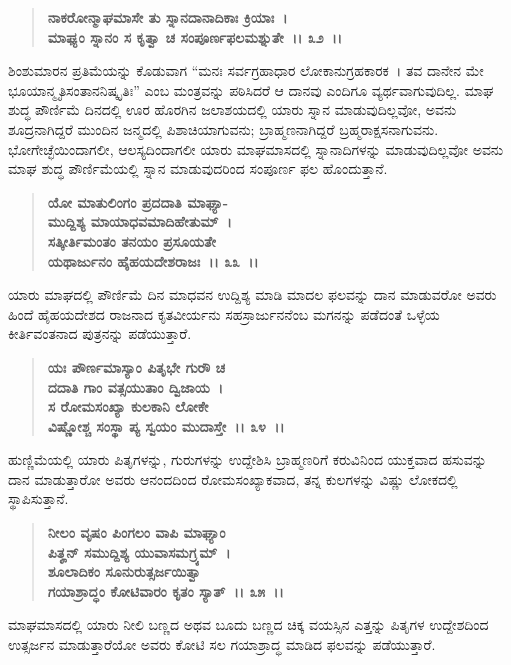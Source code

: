 \begin{verse}
\textbf{ನಾಕರೋನ್ಮಾಘಮಾಸೇ ತು ಸ್ನಾನದಾನಾದಿಕಾಃ ಕ್ರಿಯಾಃ~।}\\\textbf{ಮಾಘ್ಯಂ ಸ್ನಾನಂ ಸ ಕೃತ್ವಾ ಚ ಸಂಪೂರ್ಣಫಲಮಶ್ನುತೇ~।। ೩೨~।।}
\end{verse}

ಶಿಂಶುಮಾರನ ಪ್ರತಿಮೆಯನ್ನು ಕೊಡುವಾಗ “ಮನಃ ಸರ್ವಗ್ರಹಾಧಾರ ಲೋಕಾನುಗ್ರಹಕಾರಕ~। ತವ ದಾನೇನ ಮೇ ಭೂಯಾನ್ಮೃತಿಸಂತಾನನಿಷ್ಕೃತಿಃ” ಎಂಬ ಮಂತ್ರವನ್ನು ಪಠಿಸಿದರೆ ಆ ದಾನವು ಎಂದಿಗೂ ವ್ಯರ್ಥವಾಗುವುದಿಲ್ಲ. ಮಾಘ ಶುದ್ಧ ಪೌರ್ಣಿಮೆ ದಿನದಲ್ಲಿ ಊರ ಹೊರಗಿನ ಜಲಾಶಯದಲ್ಲಿ ಯಾರು ಸ್ನಾನ ಮಾಡುವುದಿಲ್ಲವೋ, ಅವನು ಶೂದ್ರನಾಗಿದ್ದರೆ ಮುಂದಿನ ಜನ್ಮದಲ್ಲಿ ಪಿಶಾಚಿಯಾಗುವನು; ಬ್ರಾಹ್ಮಣನಾಗಿದ್ದರೆ ಬ್ರಹ್ಮರಾಕ್ಷಸನಾಗುವನು. ಭೋಗೇಚ್ಛೆಯಿಂದಾಗಲೀ, ಆಲಸ್ಯದಿಂದಾಗಲೀ ಯಾರು ಮಾಘಮಾಸದಲ್ಲಿ ಸ್ನಾನಾದಿಗಳನ್ನು ಮಾಡುವುದಿಲ್ಲವೋ ಅವನು ಮಾಘ ಶುದ್ಧ ಪೌರ್ಣಿಮೆಯಲ್ಲಿ ಸ್ನಾನ ಮಾಡುವುದರಿಂದ ಸಂಪೂರ್ಣ ಫಲ ಹೊಂದುತ್ತಾನೆ.

\begin{verse}
\textbf{ಯೋ ಮಾತುಲಿಂಗಂ ಪ್ರದದಾತಿ ಮಾಘ್ಯಾ-}\\\textbf{ಮುದ್ದಿಶ್ಯ ಮಾಯಾಧವಮಾದಿಹೇತುಮ್~।}\\\textbf{ಸತ್ಕೀರ್ತಿಮಂತಂ ತನಯಂ ಪ್ರಸೂಯತೇ} \\\textbf{ಯಥಾರ್ಜುನಂ ಹೈಹಯದೇಶರಾಜಃ~।। ೩೩~।।}
\end{verse}

ಯಾರು ಮಾಘದಲ್ಲಿ ಪೌರ್ಣಿಮೆ ದಿನ ಮಾಧವನ ಉದ್ದಿಶ್ಯ ಮಾಡಿ ಮಾದಲ ಫಲವನ್ನು ದಾನ ಮಾಡುವರೋ ಅವರು ಹಿಂದೆ ಹೈಹಯದೇಶದ ರಾಜನಾದ ಕೃತವೀರ್ಯನು ಸಹಸ್ರಾರ್ಜುನನೆಂಬ ಮಗನನ್ನು ಪಡೆದಂತೆ ಒಳ್ಳೆಯ ಕೀರ್ತಿವಂತನಾದ ಪುತ್ರನನ್ನು ಪಡೆಯುತ್ತಾರೆ.

\begin{verse}
\textbf{ಯಃ ಪೌರ್ಣಮಾಸ್ಯಾಂ ಪಿತೃಭೇ ಗುರೌ‌ ಚ} \\\textbf{ದದಾತಿ ಗಾಂ ವತ್ಸಯುತಾಂ ದ್ವಿಜಾಯ~।}\\\textbf{ಸ ರೋಮಸಂಖ್ಯಾ ಕುಲಕಾನಿ ಲೋಕೇ} \\\textbf{ವಿಷ್ಣೋಶ್ಚ ಸಂಸ್ಥಾ ಪ್ಯ ಸ್ವಯಂ ಮುದಾಸ್ತೇ~।। ೩೪~।।}
\end{verse}

ಹುಣ್ಣಿಮೆಯಲ್ಲಿ ಯಾರು ಪಿತೃಗಳನ್ನು, ಗುರುಗಳನ್ನು ಉದ್ದೇಶಿಸಿ ಬ್ರಾಹ್ಮಣರಿಗೆ ಕರುವಿ\-ನಿಂದ ಯುಕ್ತವಾದ ಹಸುವನ್ನು ದಾನ ಮಾಡುತ್ತಾರೋ ಅವರು ಆನಂದದಿಂದ ರೋಮ\-ಸಂಖ್ಯಾಕವಾದ, ತನ್ನ ಕುಲಗಳನ್ನು ವಿಷ್ಣು ಲೋಕದಲ್ಲಿ ಸ್ಥಾಪಿಸುತ್ತಾನೆ.

\begin{verse}
\textbf{ನೀಲಂ ವೃಷಂ ಪಿಂಗಲಂ ವಾಪಿ ಮಾಘ್ಯಾಂ} \\\textbf{ಪಿತೄನ್ ಸಮುದ್ದಿಶ್ಯ ಯುವಾಸಮಗ್ರ್ಯಮ್~।}\\\textbf{ಶೂಲಾದಿಕಂ ಸೂನುರುತ್ಸರ್ಜಯಿತ್ವಾ} \\\textbf{ಗಯಾಶ್ರಾದ್ಧಂ ಕೋಟಿವಾರಂ ಕೃತಂ ಸ್ಯಾತ್~।। ೩೫~।।}
\end{verse}

ಮಾಘಮಾಸದಲ್ಲಿ ಯಾರು ನೀಲಿ ಬಣ್ಣದ ಅಥವ ಬೂದು ಬಣ್ಣದ ಚಿಕ್ಕ ವಯಸ್ಸಿನ ಎತ್ತನ್ನು ಪಿತೃಗಳ ಉದ್ದೇಶದಿಂದ ಉತ್ಸರ್ಜನ ಮಾಡುತ್ತಾರೆಯೋ ಅವರು ಕೋಟಿ ಸಲ ಗಯಾಶ್ರಾದ್ಧ ಮಾಡಿದ ಫಲವನ್ನು ಪಡೆಯುತ್ತಾರೆ.

